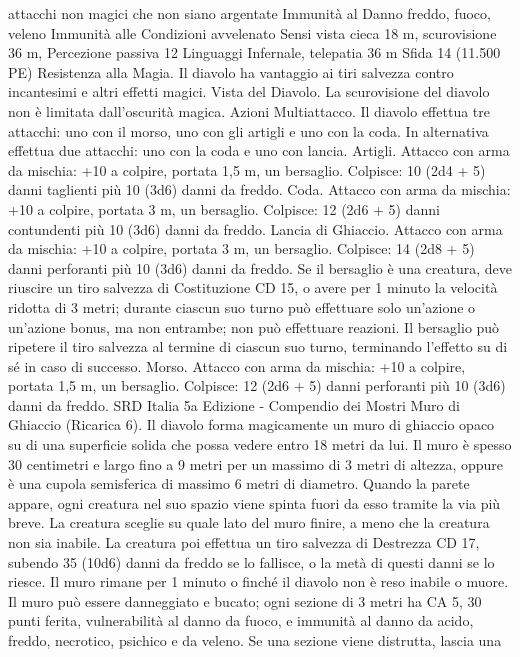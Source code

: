 \begin{multicols}{2}
attacchi non magici che non siano argentate
Immunità al Danno freddo, fuoco, veleno
Immunità alle Condizioni avvelenato
Sensi vista cieca 18 m, scurovisione 36 m, Percezione passiva 12
Linguaggi Infernale, telepatia 36 m
Sfida 14 (11.500 PE)
Resistenza alla Magia. Il diavolo ha vantaggio ai tiri salvezza
contro incantesimi e altri effetti magici.
Vista del Diavolo. La scurovisione del diavolo non è limitata
dall’oscurità magica.
Azioni
Multiattacco. Il diavolo effettua tre attacchi: uno con il morso,
uno con gli artigli e uno con la coda. In alternativa effettua due
attacchi: uno con la coda e uno con lancia.
Artigli. Attacco con arma da mischia: +10 a colpire, portata 1,5
m, un bersaglio.
Colpisce: 10 (2d4 + 5) danni taglienti più 10 (3d6) danni da
freddo.
Coda. Attacco con arma da mischia: +10 a colpire, portata 3 m,
un bersaglio.
Colpisce: 12 (2d6 + 5) danni contundenti più 10 (3d6) danni da
freddo.
Lancia di Ghiaccio. Attacco con arma da mischia: +10 a colpire,
portata 3 m, un bersaglio.
Colpisce: 14 (2d8 + 5) danni perforanti più 10 (3d6) danni da
freddo. Se il bersaglio è una creatura, deve riuscire un tiro
salvezza di Costituzione CD 15, o avere per 1 minuto la velocità
ridotta di 3 metri; durante ciascun suo turno può effettuare solo
un’azione o un’azione bonus, ma non entrambe; non può
effettuare reazioni. Il bersaglio può ripetere il tiro salvezza al
termine di ciascun suo turno, terminando l’effetto su di sé in caso
di successo.
Morso. Attacco con arma da mischia: +10 a colpire, portata 1,5
m, un bersaglio.
Colpisce: 12 (2d6 + 5) danni perforanti più 10 (3d6) danni da
freddo.
SRD Italia 5a Edizione - Compendio dei Mostri
Muro di Ghiaccio (Ricarica 6). Il diavolo forma magicamente
un muro di ghiaccio opaco su di una superficie solida che possa
vedere entro 18 metri da lui. Il muro è spesso 30 centimetri e
largo fino a 9 metri per un massimo di 3 metri di altezza, oppure
è una cupola semisferica di massimo 6 metri di diametro.
Quando la parete appare, ogni creatura nel suo spazio viene
spinta fuori da esso tramite la via più breve. La creatura sceglie
su quale lato del muro finire, a meno che la creatura non sia
inabile. La creatura poi effettua un tiro salvezza di Destrezza CD
17, subendo 35 (10d6) danni da freddo se lo fallisce, o la metà di
questi danni se lo riesce.
Il muro rimane per 1 minuto o finché il diavolo non è reso
inabile o muore. Il muro può essere danneggiato e bucato; ogni
sezione di 3 metri ha CA 5, 30 punti ferita, vulnerabilità al danno
da fuoco, e immunità al danno da acido, freddo, necrotico,
psichico e da veleno. Se una sezione viene distrutta, lascia una

\end{multicols}
